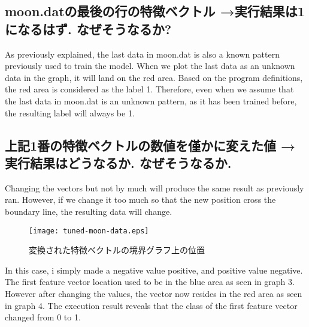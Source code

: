 \documentclass[a4j, twocolumn]{jarticle}
\begin{document}
\subsection{moon.datの最後の行の特徴ベクトル →実行結果は1になるはず. なぜそうなるか?}
As previously explained, the last data in moon.dat is also a known pattern previously used to train the model. When we plot the last data as an unknown data in the graph, it will land on the red area. Based on the program definitions, the red area is considered as the label 1. Therefore, even when we assume that the last data in moon.dat is an unknown pattern, as it has been trained before, the resulting label will always be 1.\\

\subsection{上記1番の特徴ベクトルの数値を僅かに変えた値 →実行結果はどうなるか. なぜそうなるか.}
Changing the vectors but not by much will produce the same result as previously ran. However, if we change it too much so that the new position cross the boundary line, the resulting data will change.\\

\begin{figure}
  \centering
  \texttt{[image: tuned-moon-data.eps]}
  \caption{変換された特徴ベクトルの境界グラフ上の位置}\label{changed-data-location}
\end{figure}

\begin{table}
  \caption{上記1番特徴ベクトりの数値を変化前後の結果}\label{first-data-modification}
  \centering
\end{table}
In this case, i simply made a negative value positive, and positive value negative. The first feature vector location used to be in the blue area as seen in graph 3. However after changing the values, the vector now resides in the red area as seen in graph 4. The execution result reveals that the class of the first feature vector changed from 0 to 1.\\
\end{document}
